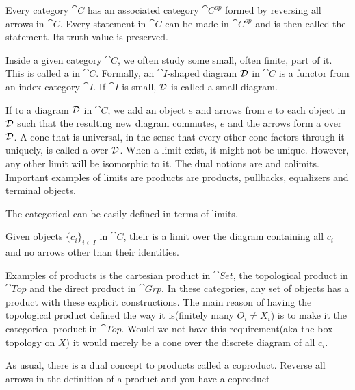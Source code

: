 \documentclass[../../main.tex]{subfiles}
\begin{document}
    Every category $\cat{C}$ has an associated category $\cat{C^{op}}$ formed by reversing all arrows in $\cat{C}$. Every statement in $\cat{C}$ can be made in $\cat{C^{op}}$ and is then called the  statement. Its truth value is preserved.
    
    Inside a given category $\cat{C}$, we often study some small, often finite, part of it. This is called a  in $\cat{C}$. Formally, an $\cat{I}$-shaped diagram $\mathcal{D}$ in $\cat{C}$ is a functor from an index category $\cat{I}$. If $\cat{I}$ is small, $\mathcal{D}$ is called a small diagram.
    
    If to a diagram $\mathcal{D}$ in $\cat{C}$, we add an object $e$ and arrows from $e$ to each object in $\mathcal{D}$ such that the resulting new diagram commutes, $e$ and the arrows form a  over $\mathcal{D}$. A cone that is universal, in the sense that every other cone factors through it uniquely, is called a  over $\mathcal{D}$. When a limit exist, it might not be unique. However, any other limit will be isomorphic to it. The dual notions are  and colimits. Important examples of limits are products are products, pullbacks, equalizers and terminal objects.
    
    
    The categorical  can be easily defined in terms of limits. 
    
    \begin{definition}
        Given objects $\{c_i\}_{i \in I}$ in $\cat{C}$, their  is a limit over the diagram containing all $c_i$ and no arrows other than their identities.
    \end{definition}
    
    Examples of products is the cartesian product in $\cat{Set}$, the topological product in $\cat{Top}$ and the direct product in $\cat{Grp}$. In these categories, any set of objects has a product with these explicit constructions. The main reason of having the topological product defined the way it is(finitely many $O_i \neq X_i$) is to make it the categorical product in $\cat{Top}$. Would we not have this requirement(aka the box topology on $X$) it would merely be a cone over the discrete diagram of all $c_i$.
    
    As usual, there is a dual concept to products called a coproduct. Reverse all arrows in the definition of a product and you have a coproduct
    
\end{document}

